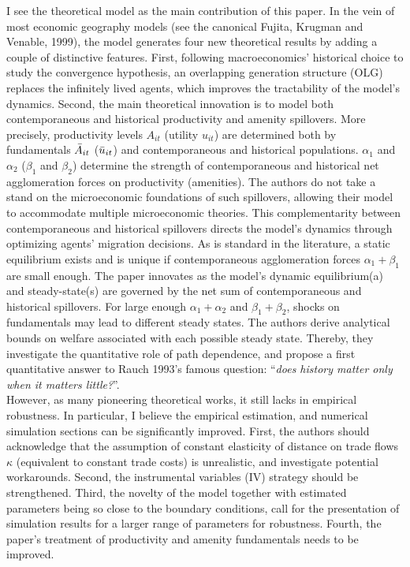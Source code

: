 \documentclass[12pt, final]{article}
\begin{document}
I see the theoretical model as the main contribution of this paper. In the vein of most economic geography models (see the canonical Fujita, Krugman and Venable, 1999), the model generates four new theoretical results by adding a couple of distinctive features.
First, following macroeconomics' historical choice to study the convergence hypothesis, an overlapping generation structure (OLG) replaces the infinitely lived agents, which improves the tractability of the model's dynamics.
Second, the main theoretical innovation is to model both contemporaneous and historical productivity and amenity spillovers. More precisely, productivity levels $A_{it}$ (utility $u_{it}$) are determined both by fundamentals $\Bar{A}_{it}$ ($\Bar{u}_{it}$) and contemporaneous and historical populations. $\alpha_1$ and $\alpha_2$ ($\beta_1$ and $\beta_2$) determine the strength of contemporaneous and historical net agglomeration forces on productivity (amenities).
The authors do not take a stand on the microeconomic foundations of such spillovers, allowing their model to accommodate multiple microeconomic theories.
%
This complementarity between contemporaneous and historical spillovers directs the model's dynamics through optimizing agents' migration decisions. 
As is standard in the literature, a static equilibrium exists and is unique if contemporaneous agglomeration forces $\alpha_1 + \beta_1$ are small enough. 
%
The paper innovates as the model's dynamic equilibrium(a) and steady-state(s) are governed by the net sum of contemporaneous and historical spillovers.
%
For large enough $\alpha_1 + \alpha_2$ and $\beta_1 + \beta_2$, shocks on fundamentals may lead to different steady states. The authors derive analytical bounds on welfare associated with each possible steady state. Thereby, they investigate the quantitative role of path dependence, and propose a first quantitative answer to Rauch 1993's famous question: ``\textit{does history matter only when it matters little?}''.
\\


However, as many pioneering theoretical works, it still lacks in empirical robustness.
In particular, I believe the empirical estimation, and numerical simulation sections can be significantly improved. 
First, the authors should acknowledge that the assumption of constant elasticity of distance on trade flows $\kappa$ (equivalent to constant trade costs) is unrealistic, and investigate potential workarounds. 
Second, the instrumental variables (IV) strategy should be strengthened. 
Third, the novelty of the model together with estimated parameters being so close to the boundary conditions, call for the presentation of simulation results for a larger range of parameters for robustness.
%
Fourth, the paper's treatment of productivity and amenity fundamentals needs to be improved.
\\
\end{document}
